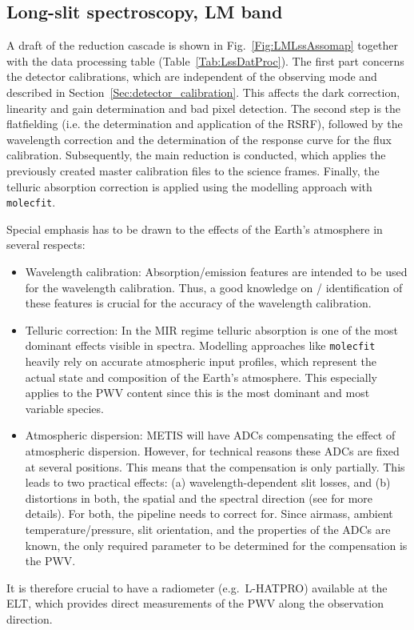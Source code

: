 \clearpage
\subsection{Long-slit spectroscopy, LM band}
\label{ssec:recipes_lss_lm}

A draft of the reduction cascade is shown in
Fig.~\ref{Fig:LMLssAssomap} together with the data processing table
(Table~\ref{Tab:LssDatProc}). The first part concerns the detector
calibrations, which are independent of the observing mode and 
described in Section~\ref{Sec:detector_calibration}. This affects the
dark correction, linearity and gain determination and bad pixel
detection. The second step is the flatfielding (i.e. the determination and application of the \ac{RSRF}), followed by the wavelength correction and the determination of the response curve for the flux calibration. Subsequently, the main reduction is conducted, which applies the previously created master calibration files to the science frames. Finally, the telluric absorption correction is applied using the modelling approach with \texttt{molecfit}.

Special emphasis has to be drawn to the effects of the Earth's
atmosphere in several respects:
\begin{itemize}
\item Wavelength calibration: Absorption/emission features are intended to be
  used for the wavelength calibration. Thus, a good knowledge on /
  identification of these features is crucial for the accuracy of the
  wavelength calibration.
\item Telluric correction: In the MIR regime telluric absorption is
  one of the most dominant effects visible in spectra. Modelling
  approaches like \texttt{molecfit} heavily rely on accurate
  atmospheric input profiles, which represent the actual state and
  composition of the Earth's atmosphere. This especially applies to
  the \ac{PWV} content since this is the most
  dominant and most variable species.
\item Atmospheric dispersion: \ac{METIS} will have \ac{ADC}s compensating the
  effect of atmospheric dispersion. However, for technical reasons
  these ADCs are fixed at several positions. This means that the
  compensation is only partially. This leads to two practical effects:
  (a) wavelength-dependent slit losses, and (b) distortions in both,
  the spatial and the spectral direction (see \cite{METIS-ADC_study}
  for more details). For both, the pipeline needs to correct
  for. Since airmass, ambient temperature/pressure, slit orientation,
  and the properties of the \ac{ADC}s are known, the only required
  parameter to be determined for the compensation is the \ac{PWV}.
\end{itemize}
It is therefore crucial to have a radiometer (e.g.\ L-HATPRO)
available at the \ac{ELT}, which provides direct measurements of the \ac{PWV}
along the observation direction.

